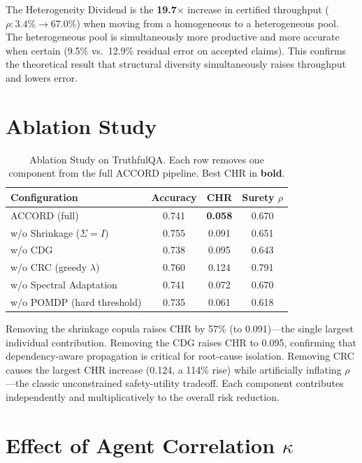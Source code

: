 \documentclass[12pt,a4paper]{report}
\begin{document}
The Heterogeneity Dividend is the \textbf{19.7$\times$} increase in certified throughput ($\rho: 3.4\% \to 67.0\%$) when moving from a homogeneous to a heterogeneous pool. The heterogeneous pool is simultaneously more productive and more accurate when certain (9.5\% vs.\ 12.9\% residual error on accepted claims). This confirms the theoretical result that structural diversity simultaneously raises throughput and lowers error.

\section{Ablation Study}

\begin{table}[H]
\centering
\caption{Ablation Study on TruthfulQA. Each row removes one component from the full ACCORD pipeline. Best CHR in \textbf{bold}.}
\label{tab:ablation}
\begin{tabular}{lccc}
\toprule
Configuration & Accuracy & CHR & Surety $\rho$ \\
\midrule
ACCORD (full)              & 0.741 & \textbf{0.058} & 0.670 \\
w/o Shrinkage ($\Sigma = I$) & 0.755 & 0.091 & 0.651 \\
w/o CDG                    & 0.738 & 0.095 & 0.643 \\
w/o CRC (greedy $\lambda$) & 0.760 & 0.124 & 0.791 \\
w/o Spectral Adaptation    & 0.741 & 0.072 & 0.670 \\
w/o POMDP (hard threshold) & 0.735 & 0.061 & 0.618 \\
\bottomrule
\end{tabular}
\end{table}

Removing the shrinkage copula raises CHR by 57\% (to 0.091)---the single largest individual contribution. Removing the CDG raises CHR to 0.095, confirming that dependency-aware propagation is critical for root-cause isolation. Removing CRC causes the largest CHR increase (0.124, a 114\% rise) while artificially inflating $\rho$---the classic unconstrained safety-utility tradeoff. Each component contributes independently and multiplicatively to the overall risk reduction.

\section{Effect of Agent Correlation $\kappa$}
\end{document}
